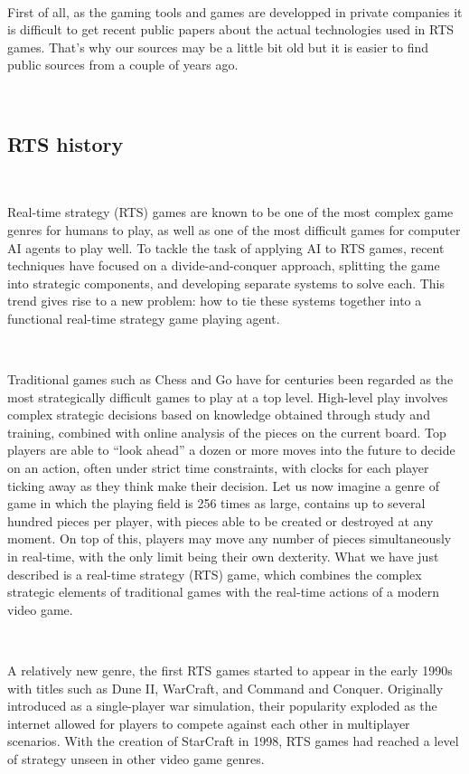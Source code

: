 \documentclass[a4paper,10pt]{book}
\begin{document}
~

First of all, as the gaming tools and games are developped in private companies it is difficult to get recent public papers about the actual technologies used in RTS games. 
That's why our sources may be a little bit old but it is easier to find public sources from a couple of years ago.

~

\subsection{RTS history}

~

Real-time strategy (RTS) games are known to be one of the
most  complex  game  genres  for  humans  to  play,  as  well  as
one  of  the  most  difficult  games  for  computer  AI  agents  to
play well.  To tackle the task of applying AI to RTS games,
recent techniques have focused on a divide-and-conquer approach, 
splitting the game into strategic components, and developing 
separate systems to solve each. This trend gives rise
to  a  new  problem:   how  to  tie  these  systems  together  into
a functional real-time strategy game playing agent.

~

Traditional games such as Chess and Go have for centuries
been  regarded  as  the  most  strategically  difficult  games  to
play at a top level. High-level play involves complex strategic
decisions  based  on  knowledge  obtained  through  study
and  training,  combined  with  online  analysis  of  the  pieces
on the current board.  Top players are able to “look ahead”
a dozen or more moves into the future to decide on an
action, often under strict time constraints, with clocks for each
player ticking away as they think make their decision.  Let
us now imagine a genre of game in which the playing field
is 256 times as large, contains up to several hundred pieces
per player, with pieces able to be created or destroyed at any
moment.  On top of this, players may move any number of
pieces simultaneously in real-time, with the only limit being
their own dexterity.   What we have just described is a
real-time strategy (RTS) game, which combines the complex
strategic elements of traditional games with the real-time 
actions of a modern video game.

~

A relatively new genre, the first RTS games started to appear
in  the  early  1990s  with  titles  such  as  Dune  II,  
WarCraft,  and Command and Conquer.   Originally introduced
as a single-player war simulation, their popularity exploded
as the internet allowed for players to compete against each
other in multiplayer scenarios. With the creation of StarCraft
in 1998, RTS games had reached a level of strategy unseen
in other video game genres.
\end{document}
